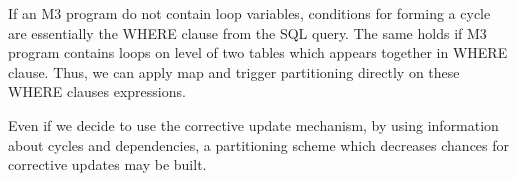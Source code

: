 \documentclass{sig-semester}
\begin{document}
If an M3 program do not contain loop variables, conditions for forming a cycle are essentially the WHERE clause from the SQL query. The same holds if M3 program contains loops on level of two tables which appears together in WHERE clause. Thus, we can apply map and trigger partitioning directly on these WHERE clauses expressions.

Even if we decide to use the corrective update mechanism, by using information about cycles and dependencies, a partitioning scheme which decreases chances for corrective updates may be built.

%
%

\newpage
\end{document}
